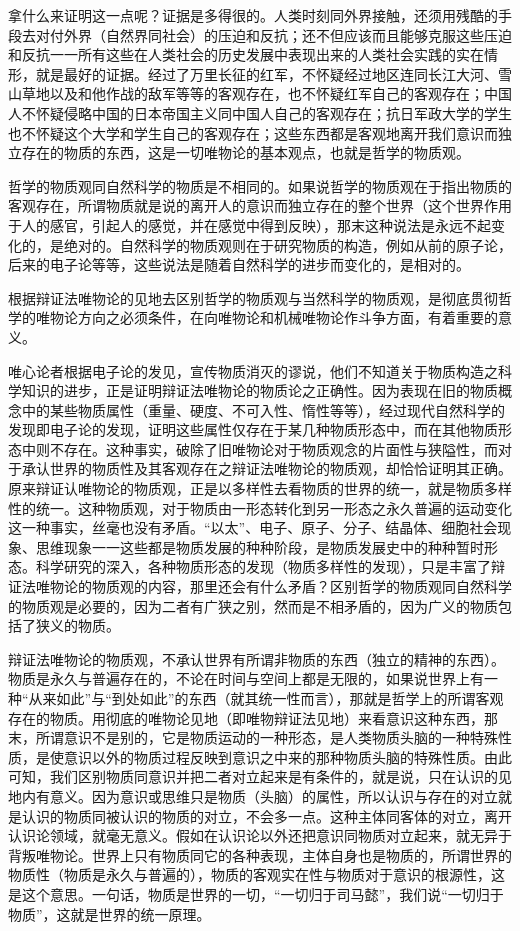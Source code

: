 拿什么来证明这一点呢？证据是多得很的。人类时刻同外界接触，还须用残酷的手段去对付外界（自然界同社会）的压迫和反抗；还不但应该而且能够克服这些压迫和反抗一一所有这些在人类社会的历史发展中表现出来的人类社会实践的实在情形，就是最好的证据。经过了万里长征的红军，不怀疑经过地区连同长江大河、雪山草地以及和他作战的敌军等等的客观存在，也不怀疑红军自己的客观存在；中国人不怀疑侵略中国的日本帝国主义同中国人自己的客观存在；抗日军政大学的学生也不怀疑这个大学和学生自己的客观存在；这些东西都是客观地离开我们意识而独立存在的物质的东西，这是一切唯物论的基本观点，也就是哲学的物质观。

哲学的物质观同自然科学的物质是不相同的。如果说哲学的物质观在于指出物质的客观存在，所谓物质就是说的离开人的意识而独立存在的整个世界（这个世界作用于人的感官，引起人的感觉，并在感觉中得到反映），那末这种说法是永远不起变化的，是绝对的。自然科学的物质观则在于研究物质的构造，例如从前的原子论，后来的电子论等等，这些说法是随着自然科学的进步而变化的，是相对的。

根据辩证法唯物论的见地去区别哲学的物质观与当然科学的物质观，是彻底贯彻哲学的唯物论方向之必须条件，在向唯物论和机械唯物论作斗争方面，有着重要的意义。

唯心论者根据电子论的发见，宣传物质消灭的谬说，他们不知道关于物质构造之科学知识的进步，正是证明辩证法唯物论的物质论之正确性。因为表现在旧的物质概念中的某些物质属性（重量、硬度、不可入性、惰性等等），经过现代自然科学的发现即电子论的发现，证明这些属性仅存在于某几种物质形态中，而在其他物质形态中则不存在。这种事实，破除了旧唯物论对于物质观念的片面性与狭隘性，而对于承认世界的物质性及其客观存在之辩证法唯物论的物质观，却恰恰证明其正确。原来辩证认唯物论的物质观，正是以多样性去看物质的世界的统一，就是物质多样性的统一。这种物质观，对于物质由一形态转化到另一形态之永久普遍的运动变化这一种事实，丝毫也没有矛盾。“以太”、电子、原子、分子、结晶体、细胞社会现象、思维现象一一这些都是物质发展的种种阶段，是物质发展史中的种种暂时形态。科学研究的深入，各种物质形态的发现（物质多样性的发现），只是丰富了辩证法唯物论的物质观的内容，那里还会有什么矛盾？区别哲学的物质观同自然科学的物质观是必要的，因为二者有广狭之别，然而是不相矛盾的，因为广义的物质包括了狭义的物质。

辩证法唯物论的物质观，不承认世界有所谓非物质的东西（独立的精神的东西）。物质是永久与普遍存在的，不论在时间与空间上都是无限的，如果说世界上有一种“从来如此”与“到处如此”的东西（就其统一性而言），那就是哲学上的所谓客观存在的物质。用彻底的唯物论见地（即唯物辩证法见地）来看意识这种东西，那末，所谓意识不是别的，它是物质运动的一种形态，是人类物质头脑的一种特殊性质，是使意识以外的物质过程反映到意识之中来的那种物质头脑的特殊性质。由此可知，我们区别物质同意识并把二者对立起来是有条件的，就是说，只在认识的见地内有意义。因为意识或思维只是物质（头脑）的属性，所以认识与存在的对立就是认识的物质同被认识的物质的对立，不会多一点。这种主体同客体的对立，离开认识论领域，就毫无意义。假如在认识论以外还把意识同物质对立起来，就无异于背叛唯物论。世界上只有物质同它的各种表现，主体自身也是物质的，所谓世界的物质性（物质是永久与普遍的），物质的客观实在性与物质对于意识的根源性，这是这个意思。一句话，物质是世界的一切，“一切归于司马懿”，我们说“一切归于物质”，这就是世界的统一原理。

